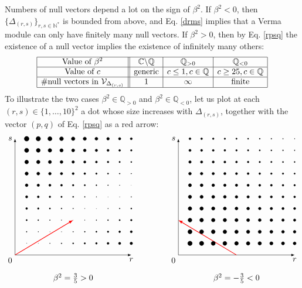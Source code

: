 \documentclass[12pt, a4paper]{article}
\theoremstyle{break}
\begin{document}
 Numbers of null vectors depend a lot on the sign of $\beta^2$. If $\beta^2<0$, then $\{\Delta_{(r, s)}\}_{r,s\in\mathbb{N}^*}$ is bounded from above, and Eq. \eqref{drms} implies that a Verma module can only have finitely many null vectors. If $\beta^2>0$, then by Eq. \eqref{rpsq} the existence of a null vector implies the existence of infinitely many others: 
\begin{align}
 \begin{array}{|c||c|c|c|}
  \hline 
  \text{Value of }\beta^2 & \mathbb{C}\backslash \mathbb{Q} & \mathbb{Q}_{>0} & \mathbb{Q}_{<0}
  \\
  \hline 
  \text{Value of }c & \text{generic} & c\leq 1 , c\in\mathbb{Q} &  c\geq 25, c\in\mathbb{Q}
  \\
  \hline 
  \#\text{null vectors in } \mathcal{V}_{\Delta_{(r, s)}} & 1 & \infty & \text{finite} 
  \\
  \hline 
 \end{array}
\end{align}
To illustrate the two cases $\beta^2\in \mathbb{Q}_{>0}$ and $\beta^2\in \mathbb{Q}_{<0}$, let us plot at each $(r,s)\in \{1,\dots, 10\}^2$ a dot whose size increases with 
$\Delta_{(r,s)}$, together with the vector $(p, q)$ of Eq. \eqref{rpsq} as a red arrow:
\begin{align}
 \begin{tikzpicture}[baseline=(base), scale = .5]
 \coordinate (base) at (0, 4);
  \draw[latex-latex] (0, 10) node [left] {$s$} -- (0, 0) node[below left] {$0$} -- (10, 0) node [below] {$r$};
  \draw[thick, red, -latex] (0, 0) -- (5, 3);
  \foreach \r in {1,...,10}{
  \foreach \s in {1,...,10}{
  \pgfmathsetmacro{\myrad}{.2+.12*abs(3*\r-5*\s)}
  \filldraw (\r, \s) circle [radius = \myrad pt];
  }}
  \node at (5, -2) {$\beta^2 = \frac35>0$};
 \end{tikzpicture}
 \qquad \qquad
 \begin{tikzpicture}[baseline=(base), scale = .5]
 \coordinate (base) at (0, 4);
  \draw[latex-latex] (0, 10) node [left] {$s$} -- (0, 0) node[below left] {$0$} -- (10, 0) node [below] {$r$};
  \draw[thick, red, -latex] (5, 0) -- (0, 3);
  \foreach \r in {1,...,10}{
  \foreach \s in {1,...,10}{
  \pgfmathsetmacro{\myrad}{6-(3*\r+5*\s)/15}
  \filldraw (\r, \s) circle [radius = \myrad pt];
  }}
  \node at (5, -2) {$\beta^2 = -\frac35<0$};
 \end{tikzpicture}
\end{align}
\end{document}
